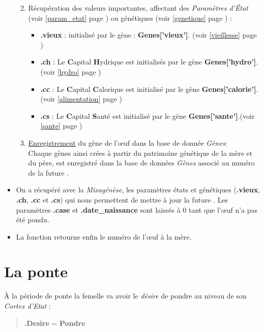 \documentclass[french]{report}
\newlength{\du}\fi
\begin{document}
\begin{itemize}
\begin{enumerate}
\begin{quote}
		\end{quote}
		\item Récupération des valeurs importantes, affectant des \textit{Paramètres d’État} (voir \ref{param_etat} page \pageref{param_etat}) ou génétiques (voir \ref{genetique} page \pageref{genetique}) : \\
		\begin{itemize} 
			\item {\textbf{.vieux}} : initialisé par le gène : \textbf{Genes['vieux']}. (voir \ref{vieillesse} page \pageref{vieillesse})
			\item {\textbf{.ch}} : Le \textbf{C}apital \textbf{H}ydrique est initialisés par le gène \textbf{Genes['hydro']}.(voir \ref{hydro} page \pageref{hydro})
			\item {\textbf{.cc}} : Le \textbf{C}apital \textbf{C}alorique est initialisé par le gène \textbf{Genes['calorie']}.(voir \ref{alimentation} page \pageref{alimentation})
			\item {\textbf{.cs}} :  Le \textbf{C}apital \textbf{S}anté est initialisé par le gène \textbf{Genes['sante']}.(voir \ref{sante} page \pageref{sante})
		\end{itemize}
		\item \underline{Enregistrement} du gène de l’œuf dans la base de donnée \textit{Gènes}:\\
		Chaque gènes ainsi crées à partir du patrimoine génétique de la mère et du père, est enregistré dans la base de données \textit{Gènes} associé au numéro de la future \CoCiX.\\
		
	\end{enumerate}
	\item On a récupéré avec la \textit{Mixagénèse}, les paramètres états et génétiques (\textbf{.vieux}, \textbf{.ch}, \textbf{.cc} et \textbf{.cs}) qui nous permettent de mettre à jour la future \CoCiX.  Les paramètres \textbf{.case} et \textbf{.date\_naissance} sont laissés à 0 tant que l’œuf n'a pas été pondu.\\
	\item La fonction retourne enfin le numéro de l’œuf à la mère.\\
	
\end{itemize} 

\section{La ponte}\label{ponte}
À la période de ponte la femelle va avoir le \textit{désire} de pondre au niveau de son \textit{Cortex d'Etat} : \\
\begin{quote}
	\textbf{.Desire} = \textbf{Pondre}\\
\end{quote}
\end{document}
